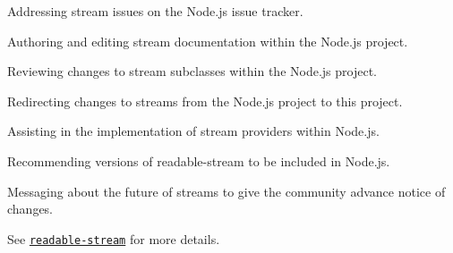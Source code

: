 \begin{DoxyItemize}
\item Addressing stream issues on the Node.\+js issue tracker.
\item Authoring and editing stream documentation within the Node.\+js project.
\item Reviewing changes to stream subclasses within the Node.\+js project.
\item Redirecting changes to streams from the Node.\+js project to this project.
\item Assisting in the implementation of stream providers within Node.\+js.
\item Recommending versions of {\ttfamily readable-\/stream} to be included in Node.\+js.
\item Messaging about the future of streams to give the community advance notice of changes.
\end{DoxyItemize}

See \href{https://github.com/nodejs/readable-stream}{\tt readable-\/stream} for more details. 